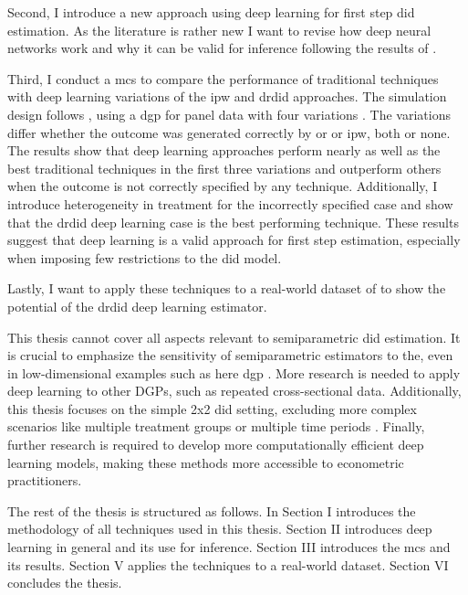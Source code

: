 Second, I introduce a new approach using deep learning for first step \ac{did} estimation.
As the literature is rather new I want to revise how deep neural networks work and why it can be valid for inference following the results of \citet{farrellDeepNeuralNetworks2021}.

Third, I conduct a \ac{mcs} to compare the performance of traditional techniques with deep learning variations of the \ac{ipw} and \ac{drdid} approaches.
The simulation design follows \citet{santannaDoublyRobustDifferenceindifferences2020}, using a \ac{dgp} for panel data with four variations .
The variations differ whether the outcome was generated correctly by \ac{or} or \ac{ipw}, both or none.
The results show that deep learning approaches perform nearly as well as the best traditional techniques in the first three variations and outperform others when the outcome is not correctly specified by any technique.
Additionally, I introduce heterogeneity in treatment for the incorrectly specified case and show that the \ac{drdid} deep learning case is the best performing technique.
These results suggest that deep learning is a valid approach for first step estimation, especially when imposing few restrictions to the \ac{did} model.

Lastly, I want to apply these techniques to a real-world dataset of \citet{meyer1990workers} to show the potential of the \ac{drdid} deep learning estimator. %


This thesis cannot cover all aspects relevant to semiparametric \ac{did} estimation.
It is crucial to emphasize the sensitivity of semiparametric estimators to the, even in low-dimensional examples such as here \ac{dgp} \citep{zimmert2018efficient} .
More research is needed to apply deep learning to other DGPs, such as repeated cross-sectional data.
Additionally, this thesis focuses on the simple 2x2 \ac{did} setting, excluding more complex scenarios like multiple treatment groups or multiple time periods \citep[see][]{callawayDifferenceinDifferencesMultipleTime2021,goodman-baconDifferenceindifferencesVariationTreatment2021}.
Finally, further research is required to develop more computationally efficient deep learning models, making these methods more accessible to econometric practitioners.

The rest of the thesis is structured as follows. In Section I introduces the methodology of all techniques used in this thesis.
Section II introduces deep learning in general and its use for inference.
Section III introduces the \ac{mcs} and its results.
Section V applies the techniques to a real-world dataset.
Section VI concludes the thesis.


